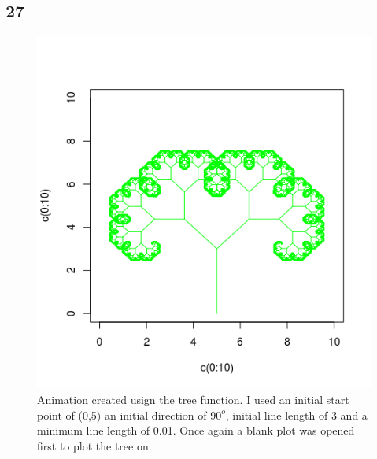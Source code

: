 \documentclass[11pt]{article}
\begin{document}
\subsection*{27}
\begin{figure}[H]
\begin{center}
\includegraphics[scale=0.5]{../Results/Plots/Tree.png}
\caption{Animation created usign the tree function. I used an initial start point of (0,5) an initial direction of $90^{o}$, initial line length of 3 and a minimum line length of 0.01. Once again a blank plot was opened first to plot the tree on.}
\end{center}
\end{figure}
\end{document}
